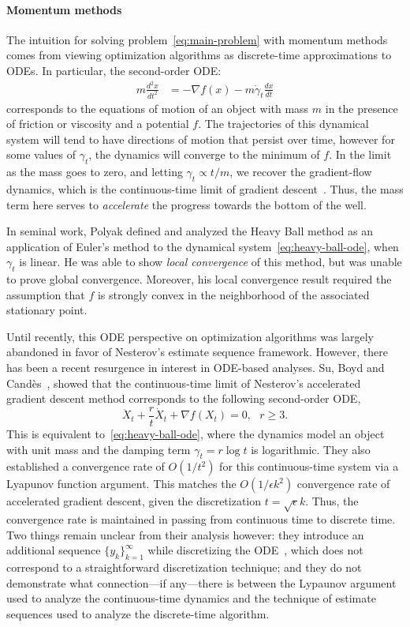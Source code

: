 \documentclass[11pt]{article}
\theoremstyle{plain}
\begin{document}
\paragraph{Momentum methods}
The intuition for solving problem~\eqref{eq:main-problem} with momentum methods comes from viewing optimization algorithms as discrete-time approximations to ODEs. In particular, the second-order ODE:
 \begin{align}\label{eq:heavy-ball-ode}
 m \frac{d^2x}{dt^2}& = - \nabla f(x) - m \dot \gamma_t \frac{dx}{dt}
 \end{align}
corresponds to the equations of motion of an object with mass $m$ in the presence of  friction or viscosity and a potential $f$. The trajectories of this dynamical system will tend to have directions of motion that persist over time, however for some values of $\gamma_t$, the dynamics will converge to the minimum of $f$.  In the limit as the mass goes to zero, and letting $\gamma_t \propto t/m$, we recover the gradient-flow dynamics, which is the continuous-time limit of gradient descent~\cite{Acceleration}.  Thus, the mass term here serves to \emph{accelerate} the progress towards the bottom of the well. 

In seminal work, Polyak defined and analyzed the Heavy Ball method as an application of Euler's method to the dynamical system~\eqref{eq:heavy-ball-ode}, when $\gamma_t$ is linear.  He was able to show \emph{local convergence} of this method, but was unable to prove global convergence.  Moreover, his local convergence result required the assumption that $f$ is strongly convex in the neighborhood of the associated stationary point.

Until recently, this ODE perspective on optimization algorithms was largely abandoned in favor of Nesterov's estimate sequence framework.  However, there has been a recent resurgence in interest in ODE-based analyses.  Su, Boyd and Cand\`es~\cite{SuBoydCandes14}, showed that the continuous-time limit of Nesterov's accelerated gradient descent method corresponds to the following second-order ODE, 
 \begin{equation}\label{Eq:SuBoydCandes}
 \ddot X_t + \frac{r}{t} \dot X_t + \nabla f(X_t) = 0,\,\,\,\,r \geq 3.
 \end{equation}
This is equivalent to~\eqref{eq:heavy-ball-ode}, where the dynamics model an object with unit mass and the damping term $\gamma_t = r\log t$ is logarithmic.  They also established a convergence rate of $O(1/t^2)$ for this continuous-time system via a Lyapunov function argument. This matches the $O(1/\epsilon k^2)$ convergence rate of accelerated gradient descent, given the discretization $t= \sqrt\epsilon k$. Thus, the convergence rate is maintained in passing from continuous time to discrete time. Two things remain unclear from their analysis however:  they introduce an additional sequence $\{y_k\}_{k=1}^\infty$ while discretizing the ODE~\cite[Sec 2]{Acceleration},  which does not correspond to a straightforward discretization technique; and they do not demonstrate what connection---if any---there is between the Lypaunov argument used to analyze the continuous-time dynamics and the technique of estimate sequences used to analyze the discrete-time algorithm. 
\end{document}
